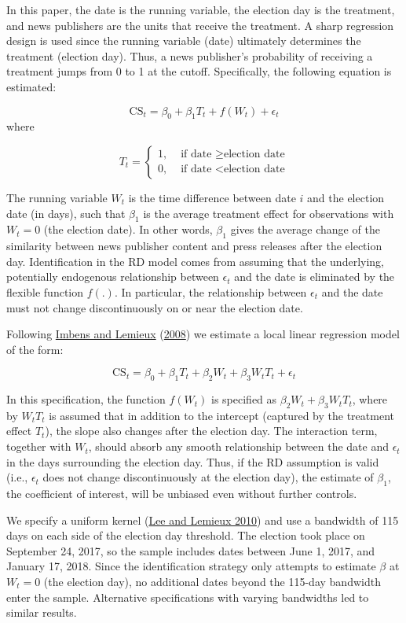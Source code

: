 \documentclass[
  12pt,
]{article}
\begin{document}
In this paper, the date is the running variable, the election day is the
treatment, and news publishers are the units that receive the treatment.
A sharp regression design is used since the running variable (date)
ultimately determines the treatment (election day). Thus, a news
publisher's probability of receiving a treatment jumps from 0 to 1 at
the cutoff. Specifically, the following equation is estimated:

\[
\text{CS}_{t}=\beta_0+\beta_1T_t+f(W_t)+\epsilon_t
\] where

\[
T_t = 
\begin{cases}
1, & \text{ if date } \geq \text{election date} \\
0, & \text{ if date } < \text{election date}
\end{cases}
\]

The running variable \(W_t\) is the time difference between date \(i\)
and the election date (in days), such that \(\beta_1\) is the average
treatment effect for observations with \(W_t = 0\) (the election date).
In other words, \(\beta_1\) gives the average change of the similarity
between news publisher content and press releases after the election
day. Identification in the RD model comes from assuming that the
underlying, potentially endogenous relationship between \(\epsilon_t\)
and the date is eliminated by the flexible function \(f(.)\). In
particular, the relationship between \(\epsilon_t\) and the date must
not change discontinuously on or near the election date.

Following \protect\hyperlink{ref-imbens_regression_2008}{Imbens and
Lemieux} (\protect\hyperlink{ref-imbens_regression_2008}{2008}) we
estimate a local linear regression model of the form:

\[
\text{CS}_{t}=\beta_0+\beta_1T_t+\beta_2W_t+\beta_3W_tT_t+\epsilon_t
\]

In this specification, the function \(f(W_t)\) is specified as
\(\beta_2W_t+\beta_3W_tT_t\), where by \(W_tT_t\) is assumed that in
addition to the intercept (captured by the treatment effect \(T_t\)),
the slope also changes after the election day. The interaction term,
together with \(W_t\), should absorb any smooth relationship between the
date and \(\epsilon_t\) in the days surrounding the election day. Thus,
if the RD assumption is valid (i.e., \(\epsilon_t\) does not change
discontinuously at the election day), the estimate of \(\beta_1\), the
coefficient of interest, will be unbiased even without further controls.

We specify a uniform kernel
(\protect\hyperlink{ref-lee_regression_2010}{Lee and Lemieux 2010}) and
use a bandwidth of 115 days on each side of the election day threshold.
The election took place on September 24, 2017, so the sample includes
dates between June 1, 2017, and January 17, 2018. Since the
identification strategy only attempts to estimate \(\beta\) at \(W_t=0\)
(the election day), no additional dates beyond the 115-day bandwidth
enter the sample. Alternative specifications with varying bandwidths led
to similar results.
\end{document}
